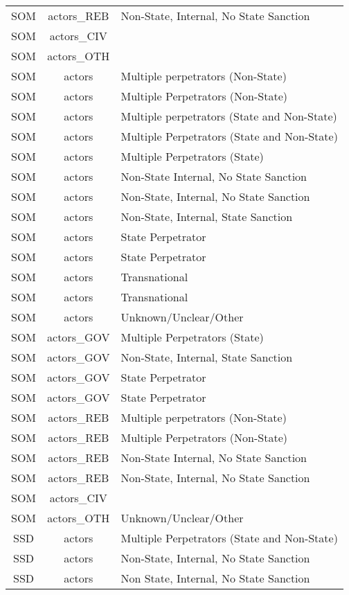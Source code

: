 \documentclass[12pt]{article}
\begin{document}
\begin{center}
\begin{longtable}{|c|c|p{10cm}|}
  SOM  & actors\_REB & Non-State, Internal, No State Sanction \\ 
  SOM  & actors\_CIV &  \\ 
  SOM  & actors\_OTH &  \\ 
  SOM & actors & Multiple perpetrators (Non-State) \\ 
  SOM & actors & Multiple Perpetrators (Non-State) \\ 
  SOM & actors & Multiple perpetrators (State and Non-State) \\ 
  SOM & actors & Multiple Perpetrators (State and Non-State) \\ 
  SOM & actors & Multiple Perpetrators (State) \\ 
  SOM & actors & Non-State Internal, No State Sanction \\ 
  SOM & actors & Non-State, Internal, No State Sanction \\ 
  SOM & actors & Non-State, Internal, State Sanction \\ 
  SOM & actors & State Perpetrator \\ 
  SOM & actors & State Perpetrator \\ 
  SOM & actors & Transnational \\ 
  SOM & actors & Transnational \\ 
  SOM & actors & Unknown/Unclear/Other \\ 
  SOM & actors\_GOV & Multiple Perpetrators (State) \\ 
  SOM & actors\_GOV & Non-State, Internal, State Sanction \\ 
  SOM & actors\_GOV & State Perpetrator \\ 
  SOM & actors\_GOV & State Perpetrator \\ 
  SOM & actors\_REB & Multiple perpetrators (Non-State) \\ 
  SOM & actors\_REB & Multiple Perpetrators (Non-State) \\ 
  SOM & actors\_REB & Non-State Internal, No State Sanction \\ 
  SOM & actors\_REB & Non-State, Internal, No State Sanction \\ 
  SOM & actors\_CIV &  \\ 
  SOM & actors\_OTH & Unknown/Unclear/Other \\ 
  SSD & actors & Multiple Perpetrators (State and Non-State) \\ 
  SSD & actors & Non-State, Internal, No State Sanction \\ 
  SSD & actors & Non State, Internal, No State Sanction \\ 

\end{longtable}
\end{center}
\end{document}
